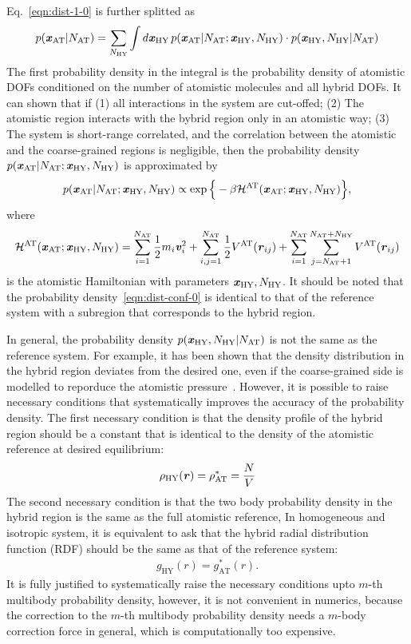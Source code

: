 \documentclass[epjST]{svjour}
\newcommand{\vect}[1]{\textbf{\textit{#1}}}
\newcommand{\mh}[0]{\mathcal {H}}
\newcommand{\AT}[0]{\textrm{AT}}
\newcommand{\HY}[0]{\textrm{HY}}
\begin{document}
Eq.~\ref{eqn:dist-1-0} is further splitted as
\begin{align}
  p(\vect x_\AT \vert N_\AT) =
  \sum_{N_\HY} \int {d}\vect x_\HY\,
  p(\vect x_\AT \vert N_\AT; \vect x_\HY, N_\HY)\cdot
  p(\vect x_\HY, N_\HY\vert N_\AT)  
\end{align}
The first probability density in the integral is the probability density
of atomistic DOFs conditioned on the number of atomistic molecules and all
hybrid DOFs.
It can shown that if
(1) all interactions in the system are cut-offed;
(2) The atomistic region interacts with the bybrid region only in an atomistic way;
(3) The system is short-range correlated, and the correlation between the atomistic
and the coarse-grained regions is negligible, then the probability density $p(\vect x_\AT \vert N_\AT; \vect x_\HY, N_\HY)$
is approximated by
\begin{align}\label{eqn:dist-conf-0}
  p(\vect x_\AT \vert N_\AT; \vect x_\HY, N_\HY)
  \propto
  \exp\Big\{-\beta \mh^\AT(\vect x_\AT; \vect x_\HY, N_\HY) \Big\},
\end{align}
where 
\begin{align}
  \mh^\AT(\vect x_\AT; \vect x_\HY, N_\HY)
  =
  \sum_{i=1}^{N_\AT}\frac12 m_i\vect v_i^2 +
  \sum_{i,j=1}^{N_\AT} \frac12 V^\AT(\vect r_{ij}) +
  \sum_{i=1}^{N_\AT}\sum_{j=N_\AT+1}^{N_\AT + N_\HY} V^\AT(\vect r_{ij})
\end{align}
is the atomistic Hamiltonian with parameters $\vect x_\HY, N_\HY$. It
should be noted that the probability density~\eqref{eqn:dist-conf-0}
is identical to that of the reference system with a subregion that
corresponds to the hybrid region.

In general, the probability density $p(\vect x_\HY, N_\HY\vert N_\AT)$
is not the same as the reference system.  For example, it has been
shown that the density distribution in the hybrid region deviates from
the desired one, even if the coarse-grained side is modelled to
reporduce the atomistic pressure~\cite{poblete2010coupling}.  However,
it is possible to raise necessary conditions that systematically
improves the accuracy of the probability density. The first necessary
condition is that the density profile of the hybrid region should be a
constant that is identical to the density of the atomistic reference
at desired equilibrium:
\begin{align}
  \rho_\HY(\vect r) = \rho_\AT^\ast = \frac NV
\end{align}
The second necessary condition is that the two body probability
density in the hybrid region is the same as the full atomistic
reference, In homogeneous and isotropic system, it is equivalent to
ask that the hybrid radial distribution function (RDF) should be the
same as that of the reference system:
\begin{align}
  g_\HY(r) = g^\ast_\AT(r).
\end{align}
It is fully justified to systematically raise the necessary conditions
upto $m$-th multibody probability density, however, it is not convenient in
numerics, because the correction to the $m$-th multibody probability density
needs a $m$-body correction force in general, which is computationally
too expensive.
\end{document}
